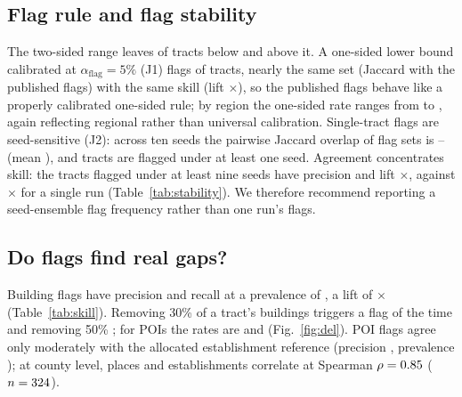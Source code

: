 \documentclass[11pt]{article}
\begin{document}
\begin{table}[t]\centering\small
\caption{Exploratory (J3): building coverage of 90\% ranges for a held-out region, calibrated globally on the other regions or on $n$ random tracts of the held-out region itself (mean over 200 draws; coverage measured on the remaining tracts).}\label{tab:transfer}

\end{table}

\subsection{Flag rule and flag stability}
The two-sided range leaves \JoTwoBelow{} of tracts below and \JoTwoAbove{} above it. A one-sided lower bound calibrated at $\alpha_{\mathrm{flag}}=5\%$ (J1) flags \JoFlagRate{} of tracts, nearly the same set (Jaccard \JoJaccard{} with the published flags) with the same skill (lift \JoLift{}$\times$), so the published flags behave like a properly calibrated one-sided rule; by region the one-sided rate ranges from \JoRegMin{} to \JoRegMax{}, again reflecting regional rather than universal calibration.
Single-tract flags are seed-sensitive (J2): across ten seeds the pairwise Jaccard overlap of flag sets is \JsPairMin{}--\JsPairMax{} (mean \JsPairMean{}), and \JsEver{} tracts are flagged under at least one seed. Agreement concentrates skill: the \JsStable{} tracts flagged under at least nine seeds have precision \JsStablePrec{} and lift \JsStableLift{}$\times$, against \JsSingleLift{}$\times$ for a single run (Table~\ref{tab:stability}). We therefore recommend reporting a seed-ensemble flag frequency rather than one run's flags.

\begin{table}[t]\centering\small
\caption{Exploratory (J1, J2): flag sets against the USA Structures gap (\RvN{} tracts; prevalence \PrevBldg{}).}\label{tab:stability}

\end{table}

\subsection{Do flags find real gaps?}
Building flags have precision \PrecBldg{} and recall \RecBldg{} at a prevalence of \PrevBldg{}, a lift of \LiftBldg{}$\times$ (Table~\ref{tab:skill}). Removing 30\% of a tract's buildings triggers a flag \DelThirtyBldg{} of the time and removing 50\% \DelFiftyBldg{}; for POIs the rates are \DelThirtyPoi{} and \DelFiftyPoi{} (Fig.~\ref{fig:del}). POI flags agree only moderately with the allocated establishment reference (precision \PrecPoi{}, prevalence \PrevPoi{}); at county level, places and establishments correlate at Spearman $\rho=0.85{}$ ($n=324{}$).
\end{document}
